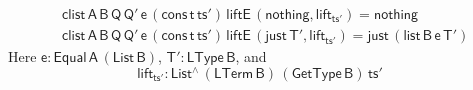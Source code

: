 \documentclass[sigplan,10pt]{acmart}
\begin{document}
\begin{align*}
  &\mathsf{clist\, A\, B\, Q\, Q'\, e\, (cons\, t\, ts') \, liftE\,
    (nothing , lift_{ts'}) = nothing} \\ 
  &\mathsf{clist\, A\, B\, Q\, Q'\, e\, (cons\, t\, ts') \, liftE\,
    (just\, T' , lift_{ts'}) = just \, (list\, B\, e\, T')} 
\end{align*}
Here $\mathsf{e : Equal\, A\, (List\,B)}$, $\mathsf{T' : LType\, B}$,
and
\[\mathsf{lift_{ts'} : List^{\wedge}\, (LTerm\, B)\, (GetType\,
  B)\, ts'}\]
\end{document}
